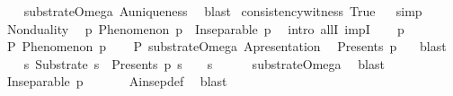 \begin{isabellebody}
%
\isadelimproof
\ \ %
\endisadelimproof
%
\isatagproof
{}\isamarkupfalse%
\ substrate{\isacharunderscore}{\kern0pt}Omega\ A{}{\isacharunderscore}{\kern0pt}uniqueness\ \isamarkupfalse%
\ blast%
\endisatagproof
{\isafoldproof}%
%
\isadelimproof
\isanewline
%
\endisadelimproof
\isanewline
{}\isamarkupfalse%
\ consistency{\isacharunderscore}{\kern0pt}witness{\isacharcolon}{\kern0pt}\ True%
\isadelimproof
\ %
\endisadelimproof
%
\isatagproof
{}\isamarkupfalse%
\ simp%
\endisatagproof
{\isafoldproof}%
%
\isadelimproof
%
\endisadelimproof
%
\isadelimdocument
%
\endisadelimdocument
%
\isatagdocument
%
\isamarkuptrue%
%
\endisatagdocument
{\isafolddocument}%
%
\isadelimdocument
%
\endisadelimdocument
{}\isamarkupfalse%
\ Nonduality{\isacharcolon}{\kern0pt}\isanewline
\ \ {\isachardoublequoteopen}{\isasymforall}p{\isachardot}{\kern0pt}\ Phenomenon\ p\ {\isasymlongrightarrow}\ Inseparable\ p\ {\isasymOmega}{\isachardoublequoteclose}\isanewline
%
\isadelimproof
%
\endisadelimproof
%
\isatagproof
{}\isamarkupfalse%
\ {\isacharparenleft}{\kern0pt}intro\ allI\ impI{\isacharparenright}{\kern0pt}\isanewline
\ \ \isamarkupfalse%
\ p\ \isamarkupfalse%
\ P{\isacharcolon}{\kern0pt}\ {\isachardoublequoteopen}Phenomenon\ p{\isachardoublequoteclose}\isanewline
\ \ \isamarkupfalse%
\ P\ substrate{\isacharunderscore}{\kern0pt}Omega\ A{}{\isacharunderscore}{\kern0pt}presentation\ \isamarkupfalse%
\ {\isachardoublequoteopen}Presents\ p\ {\isasymOmega}{\isachardoublequoteclose}\ \isamarkupfalse%
\ blast\isanewline
\ \ \isamarkupfalse%
\ {\isachardoublequoteopen}{\isasymexists}s{\isachardot}{\kern0pt}\ Substrate\ s\ {\isasymand}\ Presents\ p\ s\ {\isasymand}\ {\isasymOmega}\ {\isacharequal}{\kern0pt}\ s{\isachardoublequoteclose}\isanewline
\ \ \ \ \isamarkupfalse%
\ substrate{\isacharunderscore}{\kern0pt}Omega\ \isamarkupfalse%
\ blast\isanewline
\ \ \isamarkupfalse%
\ {\isachardoublequoteopen}Inseparable\ p\ {\isasymOmega}{\isachardoublequoteclose}\isanewline
\ \ \ \ \isamarkupfalse%
\ A{}{\isacharunderscore}{\kern0pt}insep{\isacharunderscore}{\kern0pt}def\ \isamarkupfalse%
\ blast\isanewline
{}\isamarkupfalse%
%
\endisatagproof
{\isafoldproof}%
%
\isadelimproof
%
\endisadelimproof

\end{isabellebody}
